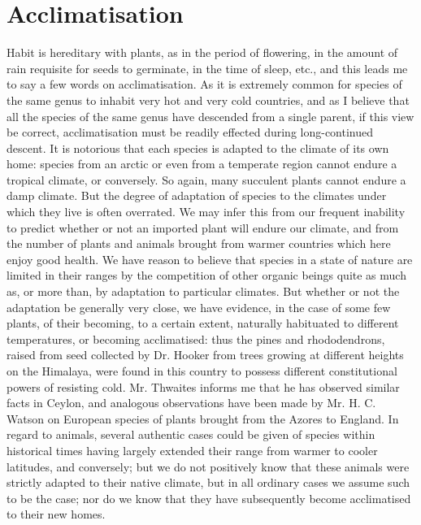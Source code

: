 \section{Acclimatisation}
Habit is hereditary with plants, as in the period of flowering, in the amount of rain requisite for seeds to germinate, in the time of sleep, etc., and this leads me to say a few words on acclimatisation. As it is extremely common for species of the same genus to inhabit very hot and very cold countries, and as I believe that all the species of the same genus have descended from a single parent, if this view be correct, acclimatisation must be readily effected during long-continued descent. It is notorious that each species is adapted to the climate of its own home: species from an arctic or even from a temperate region cannot endure a tropical climate, or conversely. So again, many succulent plants cannot endure a damp climate. But the degree of adaptation of species to the climates under which they live is often overrated. We may infer this from our frequent inability to predict whether or not an imported plant will endure our climate, and from the number of plants and animals brought from warmer countries which here enjoy good health. We have reason to believe that species in a state of nature are limited in their ranges by the competition of other organic beings quite as much as, or more than, by adaptation to particular climates. But whether or not the adaptation be generally very close, we have evidence, in the case of some few plants, of their becoming, to a certain extent, naturally habituated to different temperatures, or becoming acclimatised: thus the pines and rhododendrons, raised from seed collected by Dr. Hooker from trees growing at different heights on the Himalaya, were found in this country to possess different constitutional powers of resisting cold. Mr. Thwaites informs me that he has observed similar facts in Ceylon, and analogous observations have been made by Mr. H. C. Watson on European species of plants brought from the Azores to England. In regard to animals, several authentic cases could be given of species within historical times having largely extended their range from warmer to cooler latitudes, and conversely; but we do not positively know that these animals were strictly adapted to their native climate, but in all ordinary cases we assume such to be the case; nor do we know that they have subsequently become acclimatised to their new homes.
